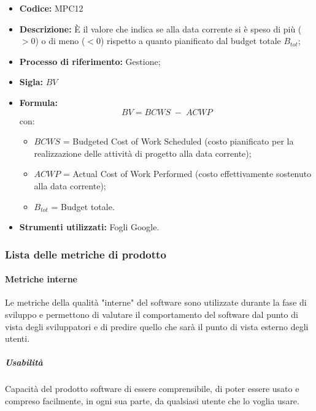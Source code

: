         \begin{itemize}
            \item \textbf{Codice:} MPC12
            \item \textbf{Descrizione:} È il valore che indica se alla data corrente si è speso di più ($>0$) o di meno ($<0$) rispetto a quanto pianificato dal budget totale $B_{tot}$;
            \item \textbf{Processo di riferimento:} Gestione;
            \item \textbf{Sigla:} $BV$
            \item \textbf{Formula:} $$BV = {BCWS \; - \; ACWP}$$
            con:
            \begin{itemize}
                \item $BCWS$ = Budgeted Cost of Work Scheduled (costo pianificato per la realizzazione delle attività di progetto alla data corrente);
                \item $ACWP$ = Actual Cost of Work Performed (costo effettivamente sostenuto alla data corrente);
                \item $B_{tot}$ = Budget totale.
            \end{itemize}
        \item \textbf{Strumenti utilizzati:} Fogli Google.
        \end{itemize}
\newpage
\subsubsection{Lista delle metriche di prodotto}
\paragraph{Metriche interne}
Le metriche della qualità "interne" del software sono utilizzate durante la fase di sviluppo e permettono di valutare il comportamento del software dal punto di vista degli sviluppatori e di predire quello che sarà il punto di vista esterno degli utenti.

\subparagraph{Usabilità}
Capacità del prodotto software di essere comprensibile, di poter essere usato e compreso facilmente, in ogni sua parte, da qualsiasi utente che lo voglia usare.\\

